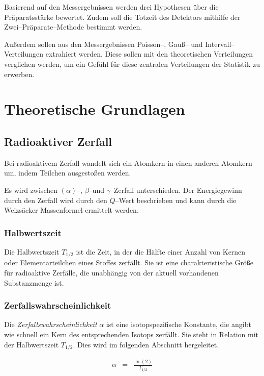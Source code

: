 \documentclass[12pt,a4paper]{scrartcl}
\numberwithin{equation}{section} %
\begin{document}
Basierend auf den Messergebnissen werden drei Hypothesen über die Präparatsstärke bewertet. Zudem soll die Totzeit des Detektors mithilfe der Zwei--Präparate--Methode bestimmt werden.

Außerdem sollen aus den Messergebnissen Poisson--, Gauß-- und Intervall--Verteilungen extrahiert werden. Diese sollen mit den theoretischen Verteilungen verglichen werden, um ein Gefühl für diese zentralen Verteilungen der Statistik zu erwerben.

\clearpage
\hypertarget{theoretische-grundlagen}{%
\section{Theoretische Grundlagen}\label{theoretische-grundlagen}}
\hypertarget{Radioaktiver Zerfall}{\subsection{Radioaktiver Zerfall}\label{Radioaktiver Zerfall}}
Bei radioaktivem Zerfall wandelt sich ein Atomkern in einen anderen Atomkern um, indem Teilchen ausgestoßen werden.

Es wird zwischen $(\alpha)$--, $\beta$--und $\gamma$--Zerfall unterschieden. Der Energiegewinn durch den Zerfall wird durch den $Q$--Wert beschrieben und kann durch die Weizsäcker Massenformel ermittelt werden.

\hypertarget{Halbwertszeit}{\subsubsection{Halbwertszeit}\label{Halbwertszeit}}
Die Halbwertszeit $T_{1/2}$ ist die Zeit, in der die Hälfte einer Anzahl von Kernen oder Elementarteilchen eines Stoffes zerfällt. Sie ist eine charakteristische Größe für radioaktive Zerfälle, die unabhängig von der aktuell vorhandenen Substanzmenge ist. \cite{Halbwertszeit}

\hypertarget{Zerfallswahrscheinlichkeit}{\subsubsection{Zerfallswahrscheinlichkeit}\label{Zerfallswahrscheinlichkeit}}
Die \emph{Zerfallswahrscheinlichkeit} $\alpha$ ist eine isotopspezifische Konstante, die angibt wie schnell ein Kern des entsprechenden Isotops zerfällt. Sie steht in Relation mit der Halbwertszeit $T_{1/2}$. Dies wird im folgenden Abschnitt hergeleitet.

\begin{eqnarray}
	\alpha &=& \frac{\ln{(2)}}{T_{1/2}} \label{eq:Zerfallswahrscheinlichkeit}
\end{eqnarray}
\end{document}
